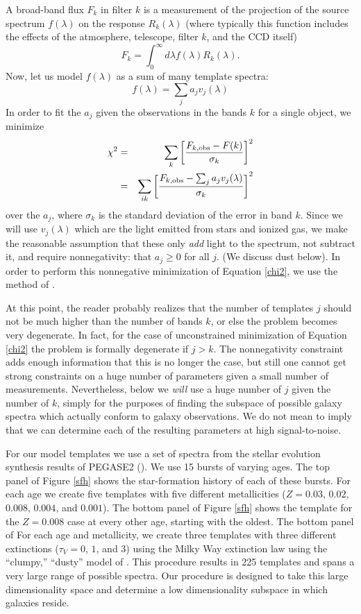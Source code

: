 \documentclass[10pt,preprint]{aastex}
\begin{document}
A broad-band flux $F_k$ in filter $k$ is a measurement of the
projection of the source spectrum $f(\lambda)$ on the response
$R_k(\lambda)$ (where typically this function includes the effects of
the atmosphere, telescope, filter $k$, and the CCD itself)
\begin{equation}
F_k = \int_0^\infty d\lambda f(\lambda) R_k(\lambda).
\end{equation}
Now, let us model $f(\lambda)$ as a sum of many template spectra:
\begin{equation}
f(\lambda) = \sum_j a_j v_j(\lambda)
\end{equation}
In order to fit the $a_j$ given the observations in the bands $k$ for
a single object, we minimize
\begin{eqnarray}
\label{chi2}
\chi^2 &=& \sum_{k} \left[ \frac{F_{k,\mathrm{obs}} - F(k)}{\sigma_k}
\right]^2 \cr
&=& \sum_{ik} \left[ \frac{F_{k,\mathrm{obs}} -\sum_j a_j
  v_j(\lambda)}{\sigma_k} \right]^2
\end{eqnarray}
over the $a_j$, where $\sigma_k$ is the standard deviation of the
error in band $k$. Since we will use $v_j(\lambda)$ which are the light
emitted from stars and ionized gas, we make the reasonable assumption
that these only {\it add} light to the spectrum, not subtract it, and
require nonnegativity: that $a_j\ge 0$ for all $j$. (We discuss dust
below).  In order to perform this nonnegative minimization of Equation
\ref{chi2}, we use the method of \citet{sha02a}. 

At this point, the reader probably realizes that the number of
templates $j$ should not be much higher than the number of bands $k$,
or else the problem becomes very degenerate. In fact, for the case of
unconstrained minimization of Equation \ref{chi2} the problem is
formally degenerate if $j>k$. The nonnegativity constraint adds enough
information that this is no longer the case, but still one cannot get
strong constraints on a huge number of parameters given a small number
of measurements. Nevertheless, below we {\it will} use a huge number
of $j$ given the number of $k$, simply for the purposes of finding the
subspace of possible galaxy spectra which actually conform to galaxy
observations. We do not mean to imply that we can determine each of
the resulting parameters at high signal-to-noise.

For our model templates we use a set of spectra from the stellar
evolution synthesis results of PEGASE2 (\citealt{fioc97a}). We use 15
bursts of varying ages. The top panel of Figure \ref{sfh} shows the
star-formation history of each of these bursts. For each age we create
five templates with five different metallicities ($Z=0.03$, $0.02$,
$0.008$, $0.004$, and $0.001$). The bottom panel of Figure \ref{sfh}
shows the template for the $Z=0.008$ case at every other age, starting
with the oldest. The bottom panel of For each age and metallicity, we
create three templates with three different extinctions ($\tau_V=0$,
$1$, and $3$) using the Milky Way extinction law using the ``clumpy,''
``dusty'' model of \citet{witt00a}. This procedure results in 225
templates and spans a very large range of possible spectra. Our
procedure is designed to take this large dimensionality space and
determine a low dimensionality subspace in which galaxies reside.
\end{document}
